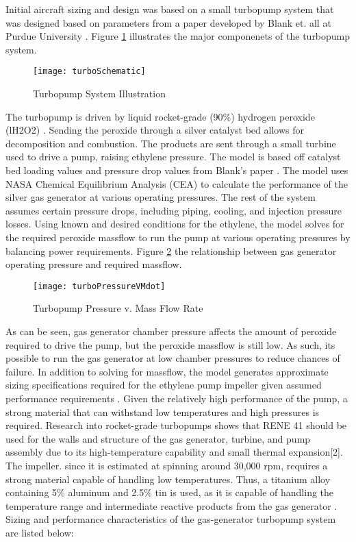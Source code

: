 Initial aircraft sizing and design was based on a small turbopump system that was designed based on parameters from a paper developed by Blank et. all at Purdue University \cite{catalyst}. Figure \ref{fig:turboSchematic} illustrates the major componenets of the turbopump system.

\begin{figure}[H]
\texttt{[image: turboSchematic]}
\caption{Turbopump System Illustration}
\label{fig:turboSchematic}
\end{figure}
 
The turbopump is driven by liquid rocket-grade (90\%) hydrogen peroxide (lH2O2) . Sending the peroxide through a silver catalyst bed allows for decomposition and combustion. The products are sent through a small turbine used to drive a pump, raising ethylene pressure. The model is based off catalyst bed loading values and pressure drop values from Blank’s paper \cite{catalyst}. The model uses NASA Chemical Equilibrium Analysis (CEA) to calculate the performance of the silver gas generator at various operating pressures. The rest of the system assumes certain pressure drops, including piping, cooling, and injection pressure losses. Using known and desired conditions for the ethylene, the model solves for the required peroxide massflow to run the pump at various operating pressures by balancing power requirements. Figure \ref{fig:turboPressureVMdot} the relationship between gas generator operating pressure and required massflow. 

\begin{figure}[H]
\begin{center}
\texttt{[image: turboPressureVMdot]}
\caption{Turbopump Pressure v. Mass Flow Rate}
\label{fig:turboPressureVMdot}
\end{center}
\end{figure}


As can be seen, gas generator chamber pressure affects the amount of peroxide required to drive the pump, but the peroxide massflow is still low. As such, its possible to run the gas generator at low chamber pressures to reduce chances of failure. In addition to solving for massflow, the model generates approximate sizing specifications required for the ethylene pump impeller given assumed performance requirements \cite{sutton}. Given the relatively high performance of the pump, a strong material that can withstand low temperatures and high pressures is required. Research into rocket-grade turbopumps \cite{turbo} shows that RENE 41 should be used for the walls and structure of the gas generator, turbine, and pump assembly due to its high-temperature capability and small thermal expansion[2]. The impeller. since it is estimated at spinning around 30,000 rpm, requires a strong material capable of handling low temperatures. Thus, a titanium alloy containing 5\% aluminum and 2.5\% tin is used, as it is capable of handling the temperature range and intermediate reactive products from the gas generator \cite{sutton}. Sizing and performance characteristics of the gas-generator turbopump system are listed below: 

